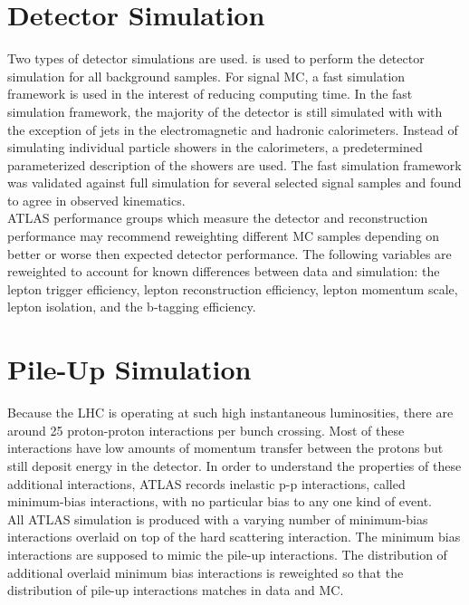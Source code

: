 \section{Detector Simulation}
\label{sec:MC:DET}

\indent Two types of detector simulations are used.   \cite{Geant} is used to perform the detector simulation for all background samples.  For signal MC, a fast simulation framework is used in the interest of reducing computing time.\cite{ATLFAST}  In the fast simulation framework, the majority of the detector is still simulated with  with the exception of jets in the electromagnetic and hadronic calorimeters.  Instead of simulating individual particle showers in the calorimeters, a predetermined parameterized description of the showers are used.  The fast simulation framework was validated against full  simulation for several selected signal samples and found to agree in observed kinematics.  \\

\indent  ATLAS performance groups which measure the detector and reconstruction performance may recommend reweighting different MC samples depending on better or worse then expected detector performance.  The following variables are reweighted to account for known differences between data and simulation: the lepton trigger efficiency, lepton reconstruction efficiency, lepton momentum scale, lepton isolation, and the b-tagging efficiency. \\

\section{Pile-Up Simulation}
\label{sec:MC:PileUp}

\indent Because the LHC is operating at such high instantaneous luminosities, there are around 25 proton-proton interactions per bunch crossing.  Most of these interactions have low amounts of momentum transfer between the protons but still deposit energy in the detector.  In order to understand the properties of these additional interactions, ATLAS records inelastic p-p interactions, called minimum-bias interactions, with no particular bias to any one kind of event.  \\

\indent All ATLAS simulation is produced with a varying number of minimum-bias interactions overlaid on top of the hard scattering interaction.  The minimum bias interactions are supposed to mimic the pile-up interactions.  The distribution of additional overlaid minimum bias interactions is reweighted so that the distribution of pile-up interactions matches in data and MC.  \\

